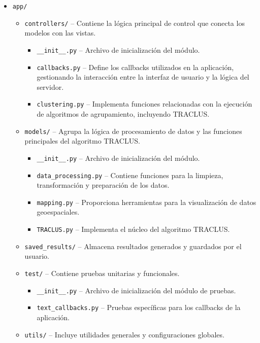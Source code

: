 \begin{itemize}
	\item \texttt{app/}
	\begin{itemize}
		\item \texttt{controllers/} -- Contiene la lógica principal de control que conecta los modelos con las vistas.
        	\begin{itemize}
        		\item \texttt{\_\_init\_\_.py} -- Archivo de inicialización del módulo.
        		\item \texttt{callbacks.py} -- Define los callbacks utilizados en la aplicación, gestionando la interacción entre la interfaz de usuario y la lógica del servidor.
        		\item \texttt{clustering.py} -- Implementa funciones relacionadas con la ejecución de algoritmos de agrupamiento, incluyendo TRACLUS.
 		\end{itemize}
        	\item \texttt{models/} -- Agrupa la lógica de procesamiento de datos y las funciones principales del algoritmo TRACLUS.
         \begin{itemize}
         	\item \texttt{\_\_init\_\_.py} -- Archivo de inicialización del módulo.
         	\item \texttt{data\_processing.py} -- Contiene funciones para la limpieza, transformación y preparación de los datos.
         	\item \texttt{mapping.py} -- Proporciona herramientas para la visualización de datos geoespaciales.
         	\item \texttt{TRACLUS.py} -- Implementa el núcleo del algoritmo TRACLUS.
		\end{itemize}
        	\item \texttt{saved\_results/} -- Almacena resultados generados y guardados por el usuario.
        	\item \texttt{test/} -- Contiene pruebas unitarias y funcionales.
        	\begin{itemize}
        		\item \texttt{\_\_init\_\_.py} -- Archivo de inicialización del módulo de pruebas.
        		\item \texttt{text\_callbacks.py} -- Pruebas específicas para los callbacks de la aplicación.
		\end{itemize}
        	\item \texttt{utils/} -- Incluye utilidades generales y configuraciones globales.

\end{itemize}
\end{itemize}
